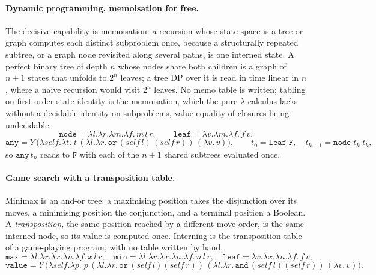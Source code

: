 \paragraph{Dynamic programming, memoisation for free.}
The decisive capability is memoisation: a recursion whose state space is a
tree or graph computes each distinct subproblem once, because a structurally repeated subtree, or a
graph node revisited along several paths, is one interned state. A perfect binary tree of depth $n$
whose nodes share both children is a graph of $n+1$ states that unfolds to $2^{n}$ leaves; a tree
DP over it is read in time linear in $n$, where a naive recursion would visit $2^{n}$ leaves. No
memo table is written; tabling on first-order state identity is the memoisation, which the pure
$\lambda$-calculus lacks without a decidable identity on subproblems, value equality of closures
being undecidable.
\[
  \mathtt{node} = \lambda l.\lambda r.\lambda m.\lambda f.\,m\,l\,r, \qquad
  \mathtt{leaf} = \lambda v.\lambda m.\lambda f.\,f\,v,
\]
\[
  \mathtt{any} = Y\,\big(\lambda\mathit{self}.\lambda t.\;
  t\,(\lambda l.\lambda r.\,\mathtt{or}\,(\mathit{self}\,l)\,(\mathit{self}\,r))\,(\lambda v.\,v)\big),
  \qquad t_0 = \mathtt{leaf}\;\mathtt{F},\quad t_{k+1} = \mathtt{node}\;t_k\;t_k,
\]
so $\mathtt{any}\,t_n$ reads to $\mathtt{F}$ with each of the $n+1$ shared subtrees evaluated once.

\paragraph{Game search with a transposition table.}
Minimax is an and-or tree: a maximising position takes the disjunction over its moves, a minimising
position the conjunction, and a terminal position a Boolean. A \emph{transposition}, the same
position reached by a different move order, is the same interned node, so its value is computed
once. Interning is the transposition table of a game-playing program, with no table written by hand.
\[
  \mathtt{max} = \lambda l.\lambda r.\lambda x.\lambda n.\lambda f.\,x\,l\,r, \quad
  \mathtt{min} = \lambda l.\lambda r.\lambda x.\lambda n.\lambda f.\,n\,l\,r, \quad
  \mathtt{leaf} = \lambda v.\lambda x.\lambda n.\lambda f.\,f\,v,
\]
\[
  \mathtt{value} = Y\,\big(\lambda\mathit{self}.\lambda p.\;
    p\,(\lambda l.\lambda r.\,\mathtt{or}\,(\mathit{self}\,l)(\mathit{self}\,r))\,
  (\lambda l.\lambda r.\,\mathtt{and}\,(\mathit{self}\,l)(\mathit{self}\,r))\,(\lambda v.\,v)\big).
\]


